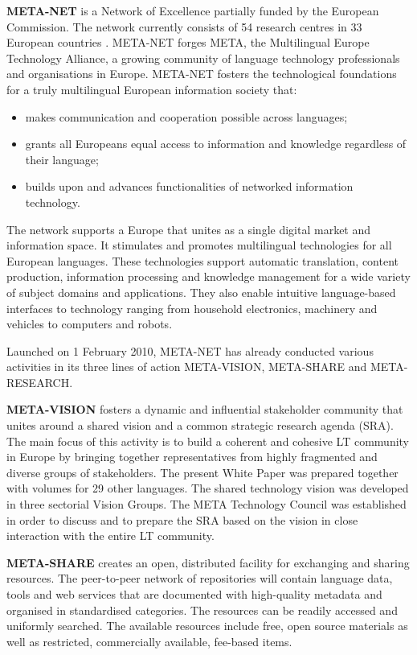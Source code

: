 \begin{multicols}{2}

\textbf{META-NET} is a Network of Excellence partially funded by the European Commission. The network currently consists of 54 research centres in 33 European countries \cite{rehm2011}. META-NET forges META, the Multilingual Europe Technology Alliance, a growing community of language technology professionals and organisations in Europe. META-NET fosters the technological foundations for a truly multilingual European information society that: 

\begin{itemize}
\item makes communication and cooperation possible across languages;
\item grants all Europeans equal access to information and knowledge regardless of their language; 
\item builds upon and advances functionalities of networked information technology.
\end{itemize}

The network supports a Europe that unites as a single digital market and information space. It stimulates and promotes multilingual technologies for all European languages. These technologies support automatic translation, content production, information processing and knowledge management for a wide variety of subject domains and applications. They also enable intuitive language-based interfaces to technology ranging from household electronics, machinery and vehicles to computers and robots.

Launched on 1 February 2010, META-NET has already conducted various activities in its three lines of action META-VISION, META-SHARE and META-RESEARCH. 

\textbf{META-VISION} fosters a dynamic and inﬂuential stakeholder community that unites around a shared vision and a common strategic research agenda (SRA). The main focus of this activity is to build a coherent and cohesive LT community in Europe by bringing together representatives from highly fragmented and diverse groups of stakeholders. The present White Paper was prepared together with volumes for 29 other languages. The shared technology vision was developed in three sectorial Vision Groups. The META Technology Council was established in order to discuss and to prepare the SRA based on the vision in close interaction with the entire LT community.

\textbf{META-SHARE} creates an open, distributed facility for exchanging and sharing resources. The peer-to-peer network of repositories will contain language data, tools and web services that are documented with high-quality metadata and organised in standardised categories. The resources can be readily accessed and uniformly searched. The available resources include free, open source materials as well as restricted, commercially available, fee-based items.


\end{multicols}
